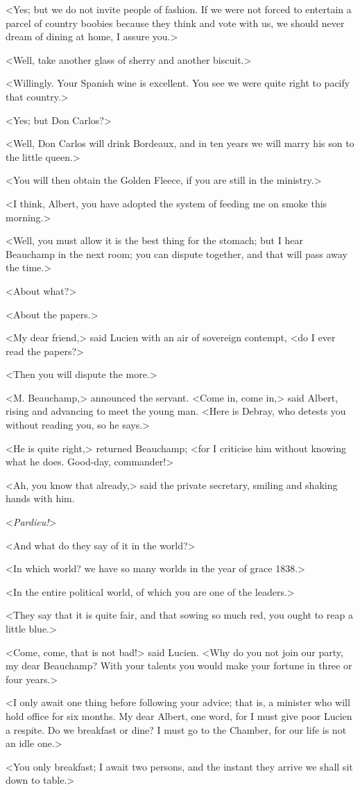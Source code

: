  <Yes; but we do not invite people of fashion. If we were not forced to entertain a parcel of country boobies because they think and vote with us, we should never dream of dining at home, I assure you.> 

 <Well, take another glass of sherry and another biscuit.> 

 <Willingly. Your Spanish wine is excellent. You see we were quite right to pacify that country.> 

 <Yes; but Don Carlos?> 

 <Well, Don Carlos will drink Bordeaux, and in ten years we will marry his son to the little queen.> 

 <You will then obtain the Golden Fleece, if you are still in the ministry.> 

 <I think, Albert, you have adopted the system of feeding me on smoke this morning.> 

 <Well, you must allow it is the best thing for the stomach; but I hear Beauchamp in the next room; you can dispute together, and that will pass away the time.> 

 <About what?> 

 <About the papers.> 

 <My dear friend,> said Lucien with an air of sovereign contempt, <do I ever read the papers?> 

 <Then you will dispute the more.> 

 <M. Beauchamp,> announced the servant. <Come in, come in,> said Albert, rising and advancing to meet the young man. <Here is Debray, who detests you without reading you, so he says.> 

 <He is quite right,> returned Beauchamp; <for I criticise him without knowing what he does. Good-day, commander!> 

 <Ah, you know that already,> said the private secretary, smiling and shaking hands with him. 

 <\textit{Pardieu!}> 

 <And what do they say of it in the world?> 

 <In which world? we have so many worlds in the year of grace 1838.> 

 <In the entire political world, of which you are one of the leaders.> 

 <They say that it is quite fair, and that sowing so much red, you ought to reap a little blue.> 

 <Come, come, that is not bad!> said Lucien. <Why do you not join our party, my dear Beauchamp? With your talents you would make your fortune in three or four years.> 

 <I only await one thing before following your advice; that is, a minister who will hold office for six months. My dear Albert, one word, for I must give poor Lucien a respite. Do we breakfast or dine? I must go to the Chamber, for our life is not an idle one.> 

 <You only breakfast; I await two persons, and the instant they arrive we shall sit down to table.> 